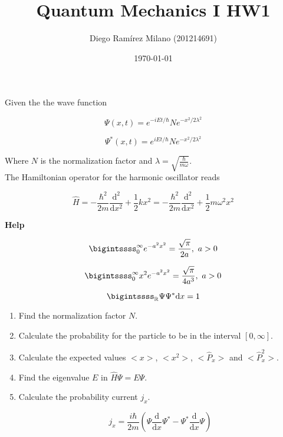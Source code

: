 \documentclass[11pt,letterpaper]{article}%
\title{\textbf{Quantum Mechanics I HW1}}
\author{Diego Ramírez Milano (201214691)}
\date{\today}
\newcommand{\dx}{\mathrm{d}x}
\begin{document}
\maketitle

Given the the wave function

\begin{equation}
\label{wavefunc}
\Psi(x,t) = e^{-iEt/\hbar}Ne^{-x^2/2\lambda^2}
\end{equation}

\begin{equation}
\label{wavefunc*}
\Psi^*(x,t) = e^{iEt/\hbar}Ne^{-x^2/2\lambda^2}
\end{equation}

Where $N$ is the normalization factor and $\lambda = \sqrt{\frac{\hbar}{m\omega}}$.\\The Hamiltonian operator for the harmonic oscillator reads

\begin{equation}
\label{hamil}
\hat{H} = -\frac{\hbar^2}{2m}\frac{\mathrm{d}^2}{\mathrm{d}x^2} + \frac{1}{2}kx^2 = -\frac{\hbar^2}{2m}\frac{\mathrm{d}^2}{\mathrm{d}x^2} + \frac{1}{2}m\omega^2x^2
\end{equation}

\textbf{Help}

\begin{equation}
\label{help1}
\bigintssss_0^{\infty}e^{-a^2x^2} = \frac{\sqrt{\pi}}{2a},\ a>0
\end{equation}

\begin{equation}
\label{help2}
\bigintssss_0^{\infty}x^2e^{-a^2x^2} = \frac{\sqrt{\pi}}{4a^3},\ a>0
\end{equation}

\begin{equation}
\label{prob}
\bigintssss_{\mathbb{R}}\Psi\Psi^*\dx = 1
\end{equation}

\begin{enumerate}
[label=\Large{\textbf{\arabic*.}}]
\item{
Find the normalization factor $N$.
}

\item{
Calculate the probability for the particle to be in the interval $[0,\infty]$.
}

\item{
Calculate the expected values $\big<x\big>$, $\big<x^2\big>$, $\big<\hat{P}_x\big>$ and $\big<\hat{P}_x^2\big>$.
}

\item{
Find the eigenvalue $E$ in $\hat{H}\Psi = E\Psi$.
}

\item
{
Calculate the probability current $j_x$.

\begin{equation}
\label{p5:1}
j_x = \frac{i\hbar}{2m}\left(\Psi \frac{\mathrm{d}}{\dx}\Psi^* - \Psi^*\frac{\mathrm{d}}{\dx}\Psi \right)
\end{equation}
}

\end{enumerate}
\end{document}
